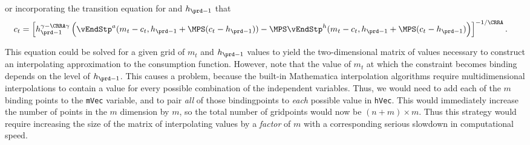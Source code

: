 \documentclass[\econtexRoot/SolvingMicroDSOPs]{subfiles}
\begin{document}
or incorporating the transition equation for
and $h_{\prd-1}$ that
\begin{equation}\begin{gathered}\begin{aligned}
  c_{t}  & = \left[h_{\prd-1}^{\gamma-\CRRA\gamma}
             \left(\vEndStp^{a}(m_{t}-c_{t},h_{\prd-1}+\MPS(c_{t}-h_{\prd-1}))
             -\MPS \vEndStp^{h}(m_{t}-c_{t},h_{\prd-1}+\MPS(c_{t}-h_{\prd-1})\right)
             \right]^{-1/\CRRA}. \nonumber
\end{aligned}\end{gathered}\end{equation}

This equation could be solved for a given grid of $m_{t}$ and
$h_{\prd-1}$ values to yield the two-dimensional matrix of values
necessary to construct an interpolating approximation to the
consumption function.  However, note that the value of $m_{t}$ at
which the constraint becomes binding depends on the level of
$h_{\prd-1}$.  This causes a problem, because the built-in {Mathematica}
interpolation algorithms require multidimensional interpolations to
contain a value for every possible combination of the independent
variables.  Thus, we would need to add each of the $m$ binding
points to the \texttt{mVec} variable, and to pair \textit{all} of
those bindingpoints to \textit{each} possible value in \texttt{hVec}.
This would immediately increase the number of points in the $m$
dimension by $m$, so the total number of gridpoints would now be
$(n+m) \times m$.  Thus this strategy would require increasing the
size of the matrix of interpolating values by a \textit{factor} of $m$
with a corresponding serious slowdown in computational speed.
\end{document}
